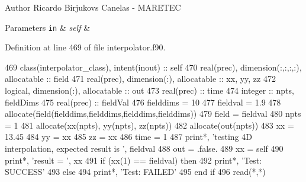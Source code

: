 \begin{DoxyAuthor}{Author}
Ricardo Birjukovs Canelas -\/ M\+A\+R\+E\+T\+EC 
\end{DoxyAuthor}

\begin{DoxyParams}[1]{Parameters}
\mbox{\tt in}  & {\em self} & \\
\hline
\end{DoxyParams}


Definition at line 469 of file interpolator.\+f90.


\begin{DoxyCode}
469     \textcolor{keywordtype}{class}(interpolator\_class), \textcolor{keywordtype}{intent(inout)} :: self
470     \textcolor{keywordtype}{real(prec)}, \textcolor{keywordtype}{dimension(:,:,:,:)}, \textcolor{keywordtype}{allocatable} :: field
471     \textcolor{keywordtype}{real(prec)}, \textcolor{keywordtype}{dimension(:)}, \textcolor{keywordtype}{allocatable} :: xx, yy, zz
472     \textcolor{keywordtype}{logical}, \textcolor{keywordtype}{dimension(:)}, \textcolor{keywordtype}{allocatable} :: out
473     \textcolor{keywordtype}{real(prec)} :: time
474     \textcolor{keywordtype}{integer} :: npts, fieldDims
475     \textcolor{keywordtype}{real(prec)} :: fieldVal
476     fielddims = 10
477     fieldval = 1.9
478     \textcolor{keyword}{allocate}(field(fielddims,fielddims,fielddims,fielddims))
479     field = fieldval
480     npts = 1
481     \textcolor{keyword}{allocate}(xx(npts), yy(npts), zz(npts))
482     \textcolor{keyword}{allocate}(out(npts))
483     xx = 13.45
484     yy = xx
485     zz = xx
486     time = 1
487     print*, \textcolor{stringliteral}{'testing 4D interpolation, expected result is '}, fieldval
488     out = .false.
489     xx = self%
490     print*, \textcolor{stringliteral}{'result = '}, xx
491     \textcolor{keywordflow}{if} (xx(1) == fieldval) \textcolor{keywordflow}{then}
492         print*, \textcolor{stringliteral}{'Test: SUCCESS'}
493     \textcolor{keywordflow}{else}
494         print*, \textcolor{stringliteral}{'Test: FAILED'}
495 \textcolor{keywordflow}{    end if}
496     \textcolor{keyword}{read}(*,*)
\end{DoxyCode}
